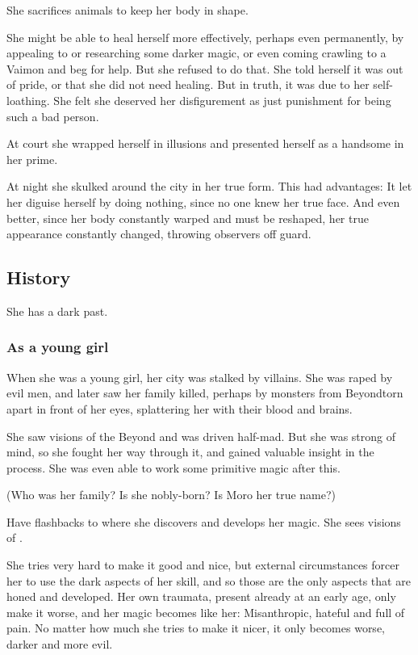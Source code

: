 She sacrifices animals to keep her body in shape. 

She might be able to heal herself more effectively, perhaps even permanently, by appealing to  or researching some darker magic, or even coming crawling to a Vaimon and beg for help. 
But she refused to do that. 
She told herself it was out of pride, or that she did not need healing. 
But in truth, it was due to her self-loathing. 
She felt she deserved her disfigurement as just punishment for being such a bad person. 

At court she wrapped herself in illusions and presented herself as a handsome \sphyle{} in her prime. 

At night she skulked around the city in her true form. 
This had advantages: It let her diguise herself by doing nothing, since no one knew her true face. 
And even better, since her body constantly warped and must be reshaped, her true appearance constantly changed, throwing observers off guard. 









\subsection{History}
She has a dark past. 





\subsubsection{As a young girl}
When she was a young girl, her city was stalked by villains. She was raped by evil men, and later saw her family killed, perhaps by monsters from Beyond\dash torn apart in front of her eyes, splattering her with their blood and brains. 

She saw visions of the Beyond and was driven half-mad. 
But she was strong of mind, so she fought her way through it, and gained valuable insight in the process. 
She was even able to work some primitive magic after this.

(Who was her family? Is she nobly-born? Is Moro \Cornel{} her true name?)

Have flashbacks to where she discovers and develops her magic. 
She sees visions of . 

She tries very hard to make it good and nice, but external circumstances forcer her to use the dark aspects of her skill, and so those are the only aspects that are honed and developed. 
Her own traumata, present already at an early age, only make it worse, and her magic becomes like her: 
Misanthropic, hateful and full of pain. 
No matter how much she tries to make it nicer, it only becomes worse, darker and more evil.

